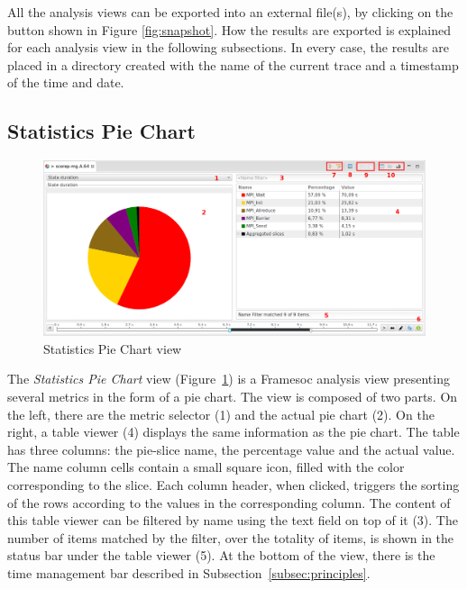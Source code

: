 \documentclass[twoside]{article}
\begin{document}
\begin{sloppypar}
All the analysis views can be exported into an external file(s), by clicking on the button shown in Figure \ref{fig:snapshot}.
How the results are exported is explained for each analysis view in the following subsections.
In every case, the results are placed in a directory created with the name of the current trace and a timestamp of the time and date.

\subsection{Statistics Pie Chart}
\label{subsec:pie}

\begin{figure}[h!]
  \centering
    \includegraphics[width=1.0\textwidth]{images/pie.png}
  \caption{Statistics Pie Chart view}
  \label{fig:pie_chart}
\end{figure}

The \emph{Statistics Pie Chart} view (Figure~\ref{fig:pie_chart}) is a Framesoc analysis view presenting several metrics in the form of a pie chart.
The view is composed of two parts.
On the left, there are the metric selector (\num{1}) and the actual pie chart (\num{2}).
On the right, a table viewer (\num{4}) displays the same information as the pie chart. 
The table has three columns: the pie-slice name, the percentage value and the actual value. 
The name column cells contain a small square icon, filled with the color corresponding to the slice.
Each column header, when clicked, triggers the sorting of the rows according to the values in the corresponding column.
The content of this table viewer can be filtered by name using the text field on top of it (\num{3}). 
The number of items matched by the filter, over the totality of items, is shown in the status bar under the table viewer (\num{5}).
At the bottom of the view, there is the time management bar described in Subsection~\ref{subsec:principles}.


\end{sloppypar}
\end{document}
